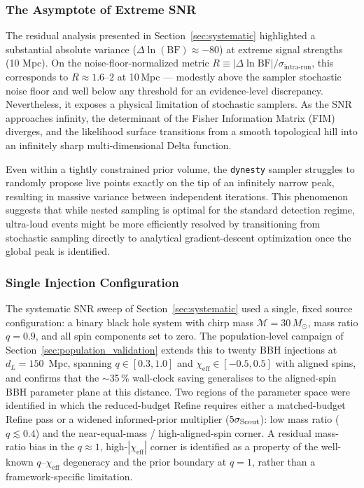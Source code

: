 \documentclass[12pt]{article}
\begin{document}
\subsubsection{The Asymptote of Extreme SNR}
The residual analysis presented in Section~\ref{sec:systematic} highlighted a substantial absolute variance ($\Delta \ln(\text{BF}) \approx -80$) at extreme signal strengths (10 Mpc). On the noise-floor-normalized metric $R \equiv |\Delta \ln \mathrm{BF}| / \sigma_{\text{intra-run}}$, this corresponds to $R \approx 1.6$--$2$ at 10\,Mpc --- modestly above the sampler stochastic noise floor and well below any threshold for an evidence-level discrepancy. Nevertheless, it exposes a physical limitation of stochastic samplers. As the SNR approaches infinity, the determinant of the Fisher Information Matrix (FIM) diverges, and the likelihood surface transitions from a smooth topological hill into an infinitely sharp multi-dimensional Delta function.

Even within a tightly constrained prior volume, the \texttt{dynesty} sampler struggles to randomly propose live points exactly on the tip of an infinitely narrow peak, resulting in massive variance between independent iterations. This phenomenon suggests that while nested sampling is optimal for the standard detection regime, ultra-loud events might be more efficiently resolved by transitioning from stochastic sampling directly to analytical gradient-descent optimization once the global peak is identified.

\subsubsection{Single Injection Configuration}
The systematic SNR sweep of Section~\ref{sec:systematic} used a single, fixed source configuration: a binary black hole system with chirp mass $\mathcal{M} = 30\,M_{\odot}$, mass ratio $q = 0.9$, and all spin components set to zero. The population-level campaign of Section~\ref{sec:population_validation} extends this to twenty BBH injections at $d_L = 150$~Mpc, spanning $q \in [0.3, 1.0]$ and $\chi_{\mathrm{eff}} \in [-0.5, 0.5]$ with aligned spins, and confirms that the $\sim$35\,\% wall-clock saving generalises to the aligned-spin BBH parameter plane at this distance. Two regions of the parameter space were identified in which the reduced-budget Refine requires either a matched-budget Refine pass or a widened informed-prior multiplier ($5\sigma_{\rm Scout}$): low mass ratio ($q \lesssim 0.4$) and the near-equal-mass / high-aligned-spin corner. A residual mass-ratio bias in the $q\!\approx\!1$, high-$|\chi_{\mathrm{eff}}|$ corner is identified as a property of the well-known $q$--$\chi_{\mathrm{eff}}$ degeneracy \citep{Hannam2013,Vitale2014,Purrer2016} and the prior boundary at $q=1$, rather than a framework-specific limitation.
\end{document}
